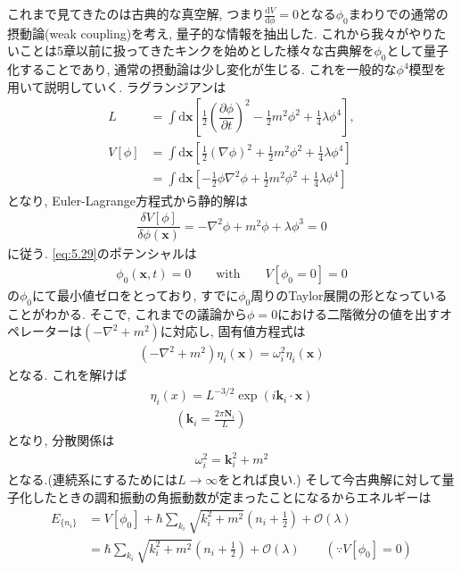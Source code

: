 \documentclass[dvipdfmx,11pt,a4paper,oneside,openany]{jsbook}
\begin{document}
これまで見てきたのは古典的な真空解, つまり$\frac{\mathrm{d}V}{\mathrm{d}\phi}=0$となる$\phi_0$まわりでの通常の摂動論(weak coupling)を考え, 量子的な情報を抽出した. これから我々がやりたいことは5章以前に扱ってきたキンクを始めとした様々な古典解を$\phi_0$として量子化することであり, 通常の摂動論は少し変化が生じる. これを一般的な$\phi^4$模型を用いて説明していく. ラグランジアンは
\begin{align}
    L       & =\int\mathrm{d}\bm{x}\left[\frac{1}{2}\left(\dfrac{\partial \phi}{\partial t}\right)^2-\frac{1}{2}m^2\phi^2+\frac{1}{4}\lambda\phi^4\right], \\
    V[\phi] & =\int\mathrm{d}\bm{x}\left[\frac{1}{2}\left(\nabla \phi\right)^2+\frac{1}{2}m^2\phi^2+\frac{1}{4}\lambda\phi^4\right]\nonumber               \\
            & =\int\mathrm{d}\bm{x}\left[-\frac{1}{2}\phi\nabla^2\phi+\frac{1}{2}m^2\phi^2+\frac{1}{4}\lambda\phi^4\right]\label{eq:5.29}
\end{align}
となり, Euler-Lagrange方程式から静的解は
\begin{align}
    \dfrac{\delta V[\phi]}{\delta \phi(\bm{x})}=-\nabla^2\phi+m^2\phi+\lambda\phi^3=0
\end{align}
に従う. \eqref{eq:5.29}のポテンシャルは
\begin{align}
    \phi_0(\bm{x},t)=0\qquad \text{with} \qquad V[\phi_0=0]=0
\end{align}
の$\phi_0$にて最小値ゼロをとっており, すでに$\phi_0$周りのTaylor展開の形となっていることがわかる. そこで, これまでの議論から$\phi=0$における二階微分の値を出すオペレーターは$(-\nabla^2+m^2)$に対応し, 固有値方程式は
\begin{align}
    \left(-\nabla^2+m^2\right)\eta_i(\bm{x})=\omega_i^2\eta_i(\bm{x})
\end{align}
となる. これを解けば
\begin{align*}
    \eta_i(x)=L^{-3/2}\exp\left(i\bm{k}_i\cdot \bm{x}\right) \\
    \qquad \left(\bm{k}_i=\frac{2\pi\bm{N}_i}{L}\right)
\end{align*}
となり, 分散関係は
\begin{align*}
    \omega_i^2=\bm{k}_i^2+m^2
\end{align*}
となる.(連続系にするためには$L\rightarrow\infty$をとれば良い.) そして今古典解に対して量子化したときの調和振動の角振動数が定まったことになるからエネルギーは
\begin{align}
    E_{\{n_i\}} & =V[\phi_0]+\hbar\sum_{k_i}\sqrt{k_i^2+m^2}\left(n_i+\frac{1}{2}\right)+\mathcal{O}(\lambda)\nonumber                      \\
                & =\hbar\sum_{k_i}\sqrt{k_i^2+m^2}\left(n_i+\frac{1}{2}\right)+\mathcal{O}(\lambda)\qquad \left(\because V[\phi_0]=0\right)
\end{align}
\end{document}
